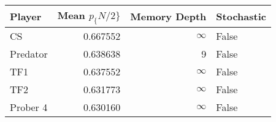 \begin{tabular}{lrrl}
\toprule
   Player &  Mean $p_\{N/2\}$ &  Memory Depth & Stochastic \\
\midrule
       CS &        0.667552 &            \(\infty\) &      False \\
 Predator &        0.638638 &             9 &      False \\
      TF1 &        0.637552 &            \(\infty\) &      False \\
      TF2 &        0.631773 &            \(\infty\) &      False \\
 Prober 4 &        0.630160 &            \(\infty\) &      False \\
\bottomrule
\end{tabular}
